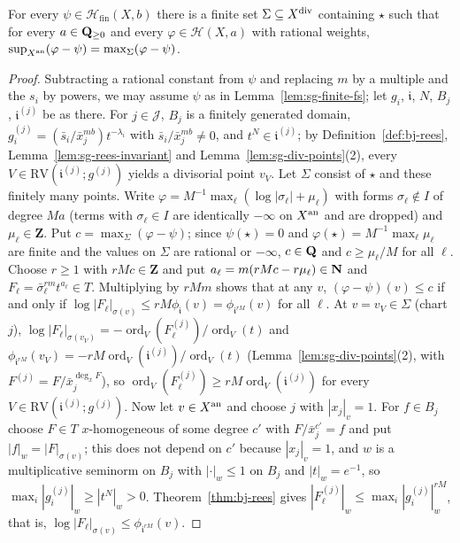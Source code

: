 \begin{lemma}\label{lem:sg-shilov}
\leanok
{}
For every $\psi\in\mathcal H_{\mathrm{fin}}(X,b)$ there is a finite set $\Sigma\subseteq X^{\mathrm{div}}$ containing $\star$ such that for every $a\in\mathbf{Q}_{\ge0}$ and
every $\varphi\in\mathcal H(X,a)$ with rational weights, $\sup_{X^{\mathrm{an}}}(\varphi-\psi)=\max_\Sigma(\varphi-\psi)$.
\end{lemma}

\begin{proof}
Subtracting a rational constant from $\psi$ and replacing $m$ by a multiple and the $s_i$ by powers, we may assume $\psi$ as in
Lemma~\ref{lem:sg-finite-fs}; let $g_i$, $\mathfrak i$, $N$, $B_j$, $\mathfrak i^{(j)}$ be as there. For $j\in\mathcal J$, $B_j$ is a finitely generated domain,
$g_i^{(j)}=(\bar s_i/\bar x_j^{mb})t^{-\lambda_i}$ with $\bar s_i/\bar x_j^{mb}\ne0$, and $t^N\in\mathfrak i^{(j)}$; by Definition~\ref{def:bj-rees},
Lemma~\ref{lem:sg-rees-invariant} and Lemma~\ref{lem:sg-div-points}(2), every $V\in\mathrm{RV}(\mathfrak i^{(j)};g^{(j)})$ yields a divisorial point
$v_V$. Let $\Sigma$ consist of $\star$ and these finitely many points. Write $\varphi=M^{-1}\max_\ell(\log|\sigma_\ell|+\mu_\ell)$ with forms
$\sigma_\ell\notin I$ of degree $Ma$ (terms with $\sigma_\ell\in I$ are identically $-\infty$ on $X^{\mathrm{an}}$ and are dropped) and $\mu_\ell\in\mathbf{Z}$. Put
$c=\max_\Sigma(\varphi-\psi)$; since $\psi(\star)=0$ and $\varphi(\star)=M^{-1}\max_\ell\mu_\ell$ are finite and the values on $\Sigma$ are rational or
$-\infty$, $c\in\mathbf{Q}$ and $c\ge\mu_\ell/M$ for all $\ell$. Choose $r\ge1$ with $rMc\in\mathbf{Z}$ and put $a_\ell=m(rMc-r\mu_\ell)\in\mathbf{N}$ and
$F_\ell=\bar\sigma_\ell^{rm}t^{a_\ell}\in T$. Multiplying by $rMm$ shows that at any $v$, $(\varphi-\psi)(v)\le c$ if and only if
$\log|F_\ell|_{\sigma(v)}\le rM\phi_{\mathfrak i}(v)=\phi_{\mathfrak i^{rM}}(v)$ for all $\ell$. At $v=v_V\in\Sigma$ (chart $j$),
$\log|F_\ell|_{\sigma(v_V)}=-\operatorname{ord}_V(F_\ell^{(j)})/\operatorname{ord}_V(t)$ and $\phi_{\mathfrak i^{rM}}(v_V)=-rM\operatorname{ord}_V(\mathfrak i^{(j)})/\operatorname{ord}_V(t)$
(Lemma~\ref{lem:sg-div-points}(2), with $F^{(j)}=F/\bar x_j^{\deg_xF}$), so $\operatorname{ord}_V(F_\ell^{(j)})\ge rM\operatorname{ord}_V(\mathfrak i^{(j)})$ for every
$V\in\mathrm{RV}(\mathfrak i^{(j)};g^{(j)})$. Now let $v\in X^{\mathrm{an}}$ and choose $j$ with $|x_j|_v=1$. For $f\in B_j$ choose $F\in T$ $x$-homogeneous of some degree
$c'$ with $F/\bar x_j^{c'}=f$ and put $|f|_w=|F|_{\sigma(v)}$; this does not depend on $c'$ because $|x_j|_v=1$, and $w$ is a multiplicative
seminorm on $B_j$ with $|\cdot|_w\le1$ on $B_j$ and $|t|_w=e^{-1}$, so $\max_i|g_i^{(j)}|_w\ge|t^N|_w>0$. Theorem~\ref{thm:bj-rees} gives
$|F_\ell^{(j)}|_w\le\max_i|g_i^{(j)}|_w^{rM}$, that is, $\log|F_\ell|_{\sigma(v)}\le\phi_{\mathfrak i^{rM}}(v)$.
\end{proof}

